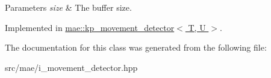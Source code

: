 \begin{DoxyParams}{Parameters}
{\em size} & The buffer size. \\
\hline
\end{DoxyParams}


Implemented in \hyperlink{classmae_1_1kp__movement__detector_a673ed3ff4f7a5cd8a02cdbe254a4508e}{mae\-::kp\-\_\-movement\-\_\-detector$<$ T, U $>$}.



The documentation for this class was generated from the following file\-:\begin{DoxyCompactItemize}
\item 
src/mae/i\-\_\-movement\-\_\-detector.\-hpp\end{DoxyCompactItemize}
